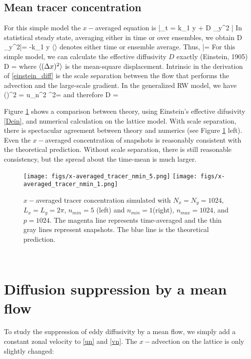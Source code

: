 \documentclass[11pt]{article}
\newcommand{\bvth}{\bar{\vth}}
\begin{document}
\subsection{Mean tracer concentration}
For this simple model the $x-$averaged equation is
\beq
\label{xave_cos}
\bvth_t   = \cos k_1 y + D \p_y^2 \bvth\com
\eeq
In statistical steady state, averaging either in time or over ensembles, we obtain
\beq
D \p_y^2\langle \bvth\rangle = -\cos k_1 y\com
\eeq
$\langle\rangle$ denotes either time or ensemble average. Thus,
\beq
\langle \bvth \rangle = \per
\eeq
For this simple model, we can calculate the effective diffusivity $D$ exactly (Einstein, 1905)
\beq
\label{einstein_diff}
D = \frac{\langle (\dx)^2 \rangle}{2 \tau}\com
\eeq
where $\langle (\Delta x)^2 \rangle$ is the mean-square displacement. Intrinsic in the derivation of
\eqref{einstein_diff} is the scale separation between the flow that performs the  advection
and the large-scale gradient. In the generalized RW model, we have
\beq
\langle (\dx)^2 \rangle = \langle u_n^2 \tau^2\rangle = \com
\eeq
and therefore
\beq
\label{Dein}
D = \per
\eeq

Figure \ref{p35} shows a comparison between theory, using Einstein's effective difusivity
\eqref{Dein}, and numerical calculation on the lattice model. With scale separation, there
is spectacular agreement between theory and numerics (see Figure \ref{p35} left). Even
the $x-$averaged concentration of snapshots is reasonably consistent with the theoretical prediction.
Without scale separation, there is still reasonable consistency, but the spread about the time-mean
is much larger.

\begin{figure}[ht]
    \label{p35}
    \centering
    \texttt{[image: figs/x-averaged\_tracer\_nmin\_5.png]}
    \texttt{[image: figs/x-averaged\_tracer\_nmin\_1.png]}
    \caption{$x-$averaged tracer concentration simulated with $N_x = N_y = 1024$, $L_x = L_y = 2 \pi$, 
        $n_{min}=5$ (left) and $n_{min}=1$(right), $n_{max}=1024$, and $p=1024$. The magenta line represents time-averaged 
            and the thin gray lines represent snapshots. The blue line is the theoretical prediction.}
\end{figure}

\
\section{Diffusion suppression by a mean flow}
To study the suppression of eddy diffusivity by a mean flow, we simply add a constant zonal velocity to 
\eqref{un} and \eqref{vn}. The $x-$advection on the lattice is only slightly changed:
\end{document}

